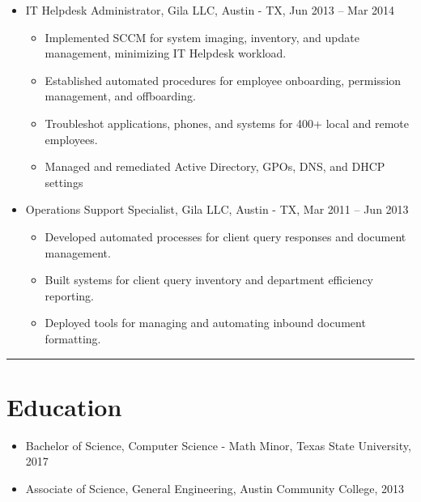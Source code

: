 \documentclass[letterpaper]{article}
\begin{document}
\begin{minipage}{\dimexpr\textwidth-1in\relax}
\begin{itemize}
    \item IT Helpdesk Administrator, Gila LLC, Austin - TX, Jun 2013 -- Mar 2014
    \begin{itemize}
        \item Implemented SCCM for system imaging, inventory, and update management, minimizing IT Helpdesk workload.
        \item Established automated procedures for employee onboarding, permission management, and offboarding.
        \item Troubleshot applications, phones, and systems for 400+ local and remote employees.
        \item Managed and remediated Active Directory, GPOs, DNS, and DHCP settings \\
    \end{itemize}
\end{itemize}

\begin{itemize}
    \item Operations Support Specialist, Gila LLC, Austin - TX, Mar 2011 -- Jun 2013
    \begin{itemize}
        \item Developed automated processes for client query responses and document management.
        \item Built systems for client query inventory and department efficiency reporting.
        \item Deployed tools for managing and automating inbound document formatting.
    \end{itemize}
\end{itemize}
\end{minipage}

\vspace{0.5em}

\textcolor{blue}{\rule{\linewidth}{1pt}}

\vspace{0.5em}
\begin{minipage}{\dimexpr\textwidth-1in\relax}
\section*{Education}
\begin{itemize}
    \item Bachelor of Science, Computer Science - Math Minor, Texas State University, 2017
    \item Associate of Science, General Engineering, Austin Community College, 2013
\end{itemize}
\end{minipage}
\vspace{0.5em}
\end{document}
